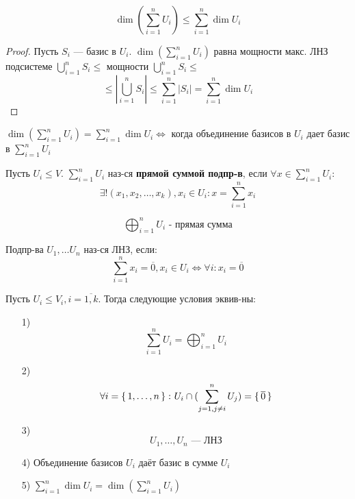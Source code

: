 \begin{consequence}
  \[
    \dim (\sum_{i = 1}^{n} U_i) \leq \sum_{i = 1}^{n} \dim U_i
  \]
\end{consequence}
\begin{proof}
Пусть $S_i$ --- базис в $U_i$. $\dim(\sum_{i = 1}^{n} U_i)$ равна мощности макс. ЛНЗ подсистеме $\bigcup_{i = 1}^{n} S_i \leq $ мощности $ \bigcup_{i = 1}^{n} S_i \leq$
\[
  \leq \left|\bigcup_{i = 1}^{n} S_i\right| \leq \sum_{i = 1}^{n} \left|S_i\right| = \sum_{i = 1}^{n} \dim U_i
\]
\end{proof}
\begin{consequence}
$\dim(\sum_{i = 1}^{n} U_i) = \sum_{i = 1}^{n} \dim U_i \iff$ когда объединение базисов в $U_i$ дает базис в $\sum_{i = 1}^{n} U_i$
\end{consequence}
\begin{definition}
  Пусть $U_i \leq V$. $\sum_{i = 1}^{n} U_i $ наз-ся \textbf{прямой суммой подпр-в}, если $\forall x \in \sum_{i = 1}^{n} U_i$:
  \[
  \exists! (x_1, x_2, \ldots, x_k), x_i \in U_i \colon x = \sum_{i = 1}^{n} x_i 
  \]

\end{definition}
\begin{symb}
  \[
    \bigoplus_{i = 1}^{n} U_i \text{ - прямая сумма}
  \]
\end{symb}
\begin{definition}
Подпр-ва $U_1, \ldots U_n$ наз-ся ЛНЗ, если:
\[
\sum_{i = 1}^{n} x_i = \overline{0}, x_i \in U_i \iff \forall i \colon x_i = \overline{0}
\]
\end{definition}
\begin{theorem}
Пусть $U_i \leq V_i, i = \overline{1, k}$. Тогда следующие условия эквив-ны:
\begin{itemize}
  \item [1) ] \[
  \sum_{i = 1}^{n} U_i = \bigoplus_{i = 1}^{n} U_i
  \]
\item [2) ] \[
\forall i = \set{1, \ldots, n} \colon U_i \cap (\sum_{j = 1, j \neq i}^{n} U_j) = \set{\overline{0}}
\]
\item [3) ] \[
U_1, \ldots, U_n \text{ --- ЛНЗ}
\]
\item [4) ] Объединение базисов $U_i$ даёт базис в сумме $U_i$
\item [5) ] $\sum_{i = 1}^{n} \dim U_i = \dim(\sum_{i = 1}^{n} U_i)$
\end{itemize}
\end{theorem}
